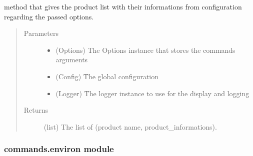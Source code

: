 \documentclass[a4paper,10pt,english]{sphinxmanual}
\begin{document}
\begin{fulllineitems}
\label{\detokenize{apidoc_commands/commands:commands.configure.get_products_list}}
method that gives the product list with their informations from 
configuration regarding the passed options.
\begin{quote}\begin{description}
\item[{Parameters}] \leavevmode\begin{itemize}
\item {} 
 \textendash{} (Options) 
The Options instance that stores the commands arguments

\item {} 
 \textendash{} (Config) The global configuration

\item {} 
 \textendash{} (Logger) 
The logger instance to use for the display and logging

\end{itemize}

\item[{Returns}] \leavevmode
(list) The list of (product name, product\_informations).

\end{description}\end{quote}

\end{fulllineitems}



\subsubsection{commands.environ module}
\label{\detokenize{apidoc_commands/commands:commands-environ-module}}\label{\detokenize{apidoc_commands/commands:module-commands.environ}}
\end{document}
